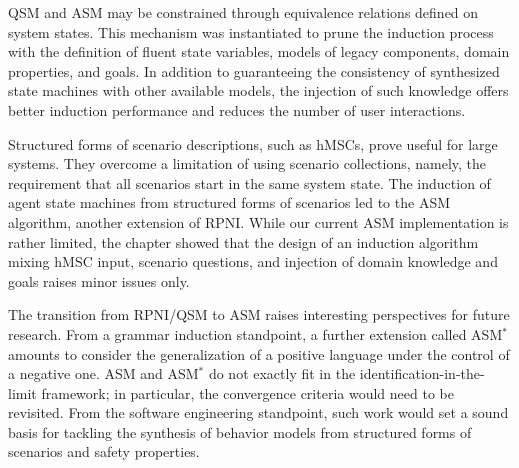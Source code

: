 QSM and ASM may be constrained through equivalence relations defined on system states. This mechanism was instantiated to prune the induction process with the definition of fluent state variables, models of legacy components, domain properties, and goals. In addition to guaranteeing the consistency of synthesized state machines with other available models, the injection of such knowledge offers better induction performance and reduces the number of user interactions.

Structured forms of scenario descriptions, such as hMSCs, prove useful for large systems. They overcome a limitation of using scenario collections, namely, the requirement that all scenarios start in the same system state. The induction of agent state machines from structured forms of scenarios led to the ASM algorithm, another extension of RPNI. While our current ASM implementation is rather limited, the chapter showed that the design of an induction algorithm mixing hMSC input, scenario questions, and injection of domain knowledge and goals raises minor issues only.

The transition from RPNI/QSM to ASM raises interesting perspectives for future research. From a grammar induction standpoint, a further extension called ASM$^*$ amounts to consider the generalization of a positive language under the control of a negative one. ASM and ASM$^*$ do not exactly fit in the identification-in-the-limit framework; in particular, the convergence criteria would need to be revisited. From the software engineering standpoint, such work would set a sound basis for tackling the synthesis of behavior models from structured forms of scenarios and safety properties.
